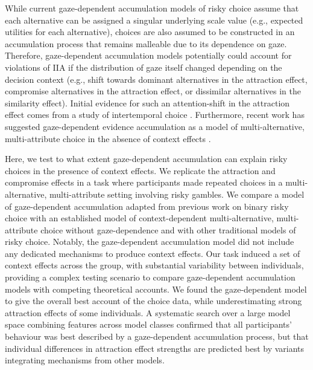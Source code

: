 \documentclass[11pt, a4paper]{article}
\begin{document}
While current gaze-dependent accumulation models of risky choice assume that each alternative can be assigned a singular underlying scale value (e.g., expected utilities for each alternative), choices are also assumed to be constructed in an accumulation process that remains malleable due to its dependence on gaze. Therefore, gaze-dependent accumulation models potentially could account for violations of IIA if the distribution of gaze itself changed depending on the decision context (e.g., shift towards dominant alternatives in the attraction effect, compromise alternatives in the attraction effect, or dissimilar alternatives in the similarity effect). Initial evidence for such an attention-shift in the attraction effect comes from a study of intertemporal choice \parencite{marini2020AttractionComesMany}. Furthermore, recent work has suggested gaze-dependent evidence accumulation as a model of multi-alternative, multi-attribute choice in the absence of context effects \parencite{cohen2017MultiattributeMultialternativeModels,gluth2018ValuebasedAttentionalCapture}.

Here, we test to what extent gaze-dependent accumulation can explain risky choices in the presence of context effects. We replicate the attraction and compromise effects in a task where participants made repeated choices in a multi-alternative, multi-attribute setting involving risky gambles. We compare a model of gaze-dependent accumulation adapted from previous work on binary risky choice \parencite{glickman2019FormationPreferenceRisky} with an established model of context-dependent multi-alternative, multi-attribute choice without gaze-dependence and with other traditional models of risky choice. Notably, the gaze-dependent accumulation model did not include any dedicated mechanisms to produce context effects. Our task induced a set of context effects across the group, with substantial variability between individuals, providing a complex testing scenario to compare gaze-dependent accumulation models with competing theoretical accounts. We found the gaze-dependent model to give the overall best account of the choice data, while underestimating strong attraction effects of some individuals. A systematic search over a large model space combining features across model classes confirmed that all participants’ behaviour was best described by a gaze-dependent accumulation process, but that individual differences in attraction effect strengths are predicted best by variants integrating mechanisms from other models.

\end{document}
